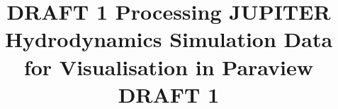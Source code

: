 \documentclass[twocolumn]{aastex62}
\begin{document}
\title{DRAFT 1 Processing JUPITER Hydrodynamics Simulation Data for Visualisation in Paraview DRAFT 1}


\end{document}
